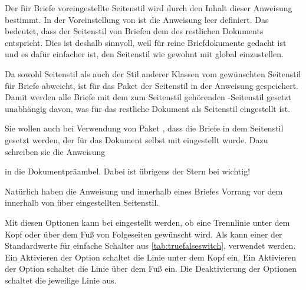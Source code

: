 \begin{Declaration}
\end{Declaration}
Der für Briefe
voreingestellte Seitenstil wird durch den Inhalt dieser Anweisung bestimmt. In
der Voreinstellung von
 ist die Anweisung leer
definiert. Das bedeutet, dass der Seitenstil von Briefen dem des restlichen
Dokuments entspricht. Dies ist deshalb sinnvoll, weil  für
reine Briefdokumente gedacht ist und es dafür einfacher ist, den Seitenstil
wie gewohnt mit  global einzustellen.

Da sowohl Seitenstil  als auch der Stil
 anderer Klassen vom gewünschten
Seitenstil für Briefe abweicht, ist für das Paket
 der
Seitenstil
%
 in der Anweisung
 gespeichert. Damit werden alle Briefe mit dem zum
Seitenstil 
gehörenden
\hyperref[desc:\LabelBase.pagestyle.plain.letter]{}-Seitenstil
gesetzt unabhängig davon, was für das restliche Dokument als Seitenstil
eingestellt ist.
\begin{Example}
  Sie wollen auch bei Verwendung von Paket , dass die
  Briefe in dem Seitenstil gesetzt werden, der für das Dokument selbst mit
   eingestellt wurde. Dazu schreiben sie die
  Anweisung
\begin{lstcode}
  \renewcommand*{\letterpagestyle}{}
\end{lstcode}
  in die Dokumentpräambel. Dabei ist übrigens der Stern bei
   wichtig!%
\end{Example}
Natürlich haben die Anweisung  und
 innerhalb eines Briefes Vorrang vor dem
innerhalb von  über 
eingestellten Seitenstil.%
\EndIndexGroup


\begin{Declaration}
\end{Declaration}%
Mit diesen Optionen kann bei  eingestellt
werden, ob eine Trennlinie unter dem
Kopf oder über dem Fuß von
Folgeseiten gewünscht wird. Als  kann einer der
Standardwerte für einfache Schalter aus \autoref{tab:truefalseswitch},
 verwendet
werden. Ein Aktivieren der Option
 schaltet die Linie unter dem Kopf
ein. Ein Aktivieren der Option
 schaltet die Linie über dem Fuß ein. Die Deaktivierung
der Optionen schaltet die jeweilige Linie aus.

